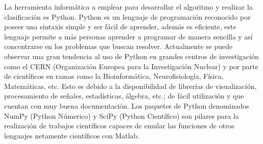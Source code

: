 La herramienta informática a emplear para desarrollar el algoritmo y realizar la clasificación es Python. Python es un lenguaje de programación reconocido por poseer una sintaxis simple y ser fácil de aprender, además es eficiente, este lenguaje permite a más personas aprender a programar de manera sencilla y así concentrarse en los problemas que buscan resolver. Actualmente se puede observar una gran tendencia al uso de Python en grandes centros de investigación como el CERN (Organización Europea para la Investigación Nuclear) y por parte de científicos en ramas como la Bioinformática, Neurofisiología, Física, Matemáticas, etc. Esto es debido a la disponibilidad de librerías de visualización, procesamiento de señales, estadísticas, álgebra, etc.; de fácil utilización y que cuentan con muy buena documentación. Los paquetes de Python denominados NumPy (Python Númerico) y SciPy (Python Científico) son pilares para la realización de trabajos científicos capaces de emular las funciones de otros lenguajes netamente científicos con Matlab.\\






